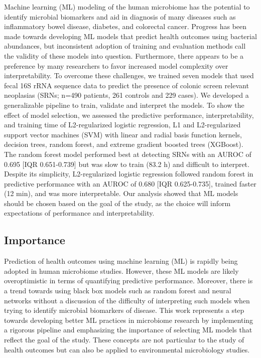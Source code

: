 \documentclass[11pt,]{article}
\begin{document}
Machine learning (ML) modeling of the human microbiome has the potential
to identify microbial biomarkers and aid in diagnosis of many diseases
such as inflammatory bowel disease, diabetes, and colorectal cancer.
Progress has been made towards developing ML models that predict health
outcomes using bacterial abundances, but inconsistent adoption of
training and evaluation methods call the validity of these models into
question. Furthermore, there appears to be a preference by many
researchers to favor increased model complexity over interpretability.
To overcome these challenges, we trained seven models that used fecal
16S rRNA sequence data to predict the presence of colonic screen
relevant neoplasias (SRNs; n=490 patients, 261 controls and 229 cases).
We developed a generalizable pipeline to train, validate and interpret
the models. To show the effect of model selection, we assessed the
predictive performance, interpretability, and training time of
L2-regularized logistic regression, L1 and L2-regularized support vector
machines (SVM) with linear and radial basis function kernels, decision
trees, random forest, and extreme gradient boosted trees (XGBoost). The
random forest model performed best at detecting SRNs with an AUROC of
0.695 {[}IQR 0.651-0.739{]} but was slow to train (83.2 h) and difficult
to interpret. Despite its simplicity, L2-regularized logistic regression
followed random forest in predictive performance with an AUROC of 0.680
{[}IQR 0.625-0.735{]}, trained faster (12 min), and was more
interpretable. Our analysis showed that ML models should be chosen based
on the goal of the study, as the choice will inform expectations of
performance and interpretability.

\newpage

\subsection{Importance}\label{importance}

Prediction of health outcomes using machine learning (ML) is rapidly
being adopted in human microbiome studies. However, these ML models are
likely overoptimistic in terms of quantifying predictive performance.
Moreover, there is a trend towards using black box models such as random
forest and neural networks without a discussion of the difficulty of
interpreting such models when trying to identify microbial biomarkers of
disease. This work represents a step towards developing better ML
practices in microbiome research by implementing a rigorous pipeline and
emphasizing the importance of selecting ML models that reflect the goal
of the study. These concepts are not particular to the study of health
outcomes but can also be applied to environmental microbiology studies.
\end{document}
